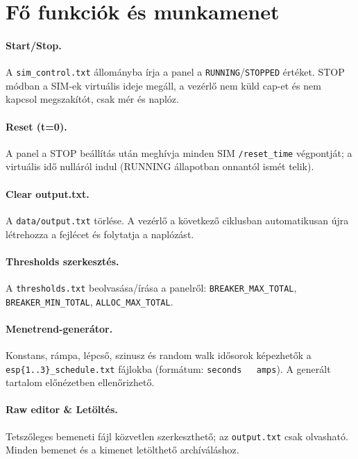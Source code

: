 \section{Fő funkciók és munkamenet}
\paragraph{Start/Stop.} A \texttt{sim\_control.txt} állományba írja a panel 
a \texttt{RUNNING}/\texttt{STOPPED} értéket. STOP módban a SIM-ek virtuális ideje megáll, 
a vezérlő nem küld cap-et és nem kapcsol megszakítót, csak mér és naplóz.
\paragraph{Reset (t=0).} A panel a STOP beállítás után meghívja minden SIM \texttt{/reset\_time} 
végpontját; a virtuális idő nulláról indul (RUNNING állapotban onnantól ismét telik).
\paragraph{Clear output.txt.} A \texttt{data/output.txt} törlése. A vezérlő a következő ciklusban 
automatikusan újra létrehozza a fejlécet és folytatja a naplózást.
\paragraph{Thresholds szerkesztés.} A \texttt{thresholds.txt} beolvasása/írása a panelről: 
\texttt{BREAKER\_MAX\_TOTAL}, \texttt{BREAKER\_MIN\_TOTAL}, \texttt{ALLOC\_MAX\_TOTAL}.
\paragraph{Menetrend-generátor.} Konstans, rámpa, lépcső, szinusz és random walk idősorok képezhetők 
a \texttt{esp\{1..3\}\_schedule.txt} fájlokba (formátum: \texttt{seconds\ \ \ amps}). 
A generált tartalom előnézetben ellenőrizhető.
\paragraph{Raw editor \& Letöltés.} Tetszőleges bemeneti fájl közvetlen szerkeszthető; 
az \texttt{output.txt} csak olvasható. Minden bemenet és a kimenet letölthető archíváláshoz.

